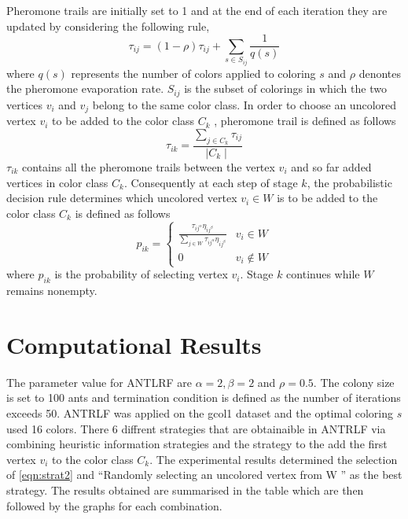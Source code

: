 \documentclass[a4paper]{article}
\begin{document}
Pheromone trails are initially set to 1 and at the end of each iteration they are updated by considering the following rule,
\begin{equation}
    \tau_{ij} = (1 -\rho) \tau_{ij} + \sum_{s \in S_{ij}} \frac{1}{q(s)}
\end{equation}
where $q(s)$ represents the number of colors applied to coloring $s$ and $\rho$ denontes the pheromone evaporation rate. $S_{ij}$ is the subset of colorings 
in which the two vertices $v_{i}$ and $v_{j}$ belong to the same color class. In order to choose an uncolored vertex $v_i$ to be added to the color class $C_k$ , pheromone trail
is defined as follows 
\begin{equation}
    \tau_{ik} = \frac{\sum_{j \in C_{k}} \tau_{ij}}{\mid C_k \mid}
\end{equation}
$\tau_{ik}$  contains all the pheromone trails between the vertex $v_{i}$ and so far added vertices in color class $C_k$. Consequently at each step of stage $k$, the probabilistic 
decision rule determines which uncolored vertex $v_i \in W$ is to be added to the color class $C_k$ is defined as follows
\begin{equation}
    p_{ik} = 
    \begin{cases}
        \frac{\tau_{{ij}^{\alpha}} \eta_{{ij}^{\beta} } }{\sum_{j \in W} \tau_{{ij}^{\alpha}} \eta_{{ij}^{\beta}}} & v_i \in W \\
        0 & v_i \notin W
    \end{cases}
\end{equation}
where $p_{ik}$ is the probability of selecting vertex $v_{i}$. Stage $k$ continues while $W$ remains nonempty.

\section*{Computational Results}
The parameter value for ANTLRF are $\alpha = 2 , \beta = 2 $ and $\rho = 0.5$. The colony size is set to 100 ants and termination condition is defined as the
number of iterations exceeds 50. ANTRLF was applied on the gcol1 dataset and the optimal coloring $s$ used 16 colors.   There 6 diffrent strategies that are obtainaible 
in ANTRLF via combining heuristic information strategies and the strategy to the add the first vertex $v_i$ to the color class $C_k$. The experimental results determined the 
selection of \ref{eqn:strat2} and ``Randomly selecting an uncolored vertex from W '' as the best strategy. The results obtained are summarised in the table which are then followed by the graphs 
for each combination.
\end{document}
